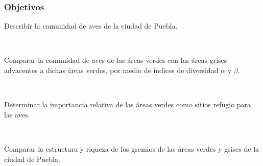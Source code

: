 \documentclass[compress]{beamer}
\begin{document}







{
\begin{frame}
\frametitle{Objetivos}
\vspace{-1.5cm}
\begin{enumerate}
\normalsize{ \item Describir la comunidad de aves de la ciudad de Puebla.}\\[1cm]
\pause
\normalsize{\item Comparar la comunidad de aves de las áreas verdes con las áreas grises adyacentes a dichas áreas verdes, por medio de índices de diversidad $\alpha$ y $\beta$.}\\[1cm]
\pause
\normalsize{\item  Determinar la importancia relativa de las áreas verdes como sitios  refugio para las aves.}\\[0.5cm]
\pause
\normalsize{ \item Comparar la estructura  y riqueza de los gremios de las áreas verdes y grises de la ciudad de Puebla.}\\[1cm]

\end{enumerate}\\[-1cm]

\end{frame}
}
\end{document}
